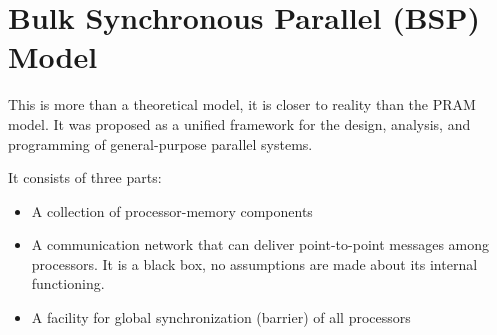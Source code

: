 \section{Bulk Synchronous Parallel (BSP) Model}
This is more than a theoretical model, it is closer to reality than the PRAM model. It was proposed as a unified framework for the design, analysis, and programming of general-purpose parallel systems.

{It consists of three parts:\ns
\begin{itemize}
	\item A collection of processor-memory components
	\item A communication network that can deliver point-to-point messages among processors. It is a black box, no assumptions are made about its internal functioning.
	\item A facility for global synchronization (barrier) of all processors
\end{itemize}}

